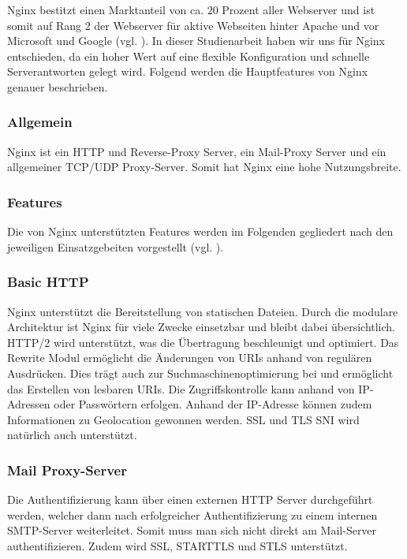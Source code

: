 Nginx bestitzt einen Marktanteil von ca. 20 Prozent aller Webserver und ist somit auf Rang 2 der Webserver für aktive Webseiten hinter Apache und vor Microsoft und Google (vgl. \cite{.k}). In dieser Studienarbeit haben wir uns für Nginx entschieden, da ein hoher Wert auf eine flexible Konfiguration und schnelle Serverantworten gelegt wird. Folgend werden die Hauptfeatures von Nginx genauer beschrieben.

\subsubsection{Allgemein}
\label{sec:NginxAllgemein}
Nginx ist ein \ac{HTTP} und Reverse-Proxy Server, ein Mail-Proxy Server und ein allgemeiner \ac{TCP}/\ac{UDP} Proxy-Server. Somit hat Nginx eine hohe Nutzungsbreite.

\subsubsection{Features}
\label{sec:NginxFeatures}
Die von Nginx unterstützten Features werden im Folgenden gegliedert nach den jeweiligen Einsatzgebeiten vorgestellt (vgl. \cite{.14.03.2017}). 

\subsubsection{Basic HTTP}
\label{sec:NginxBasicHTTP}
Nginx unterstützt die Bereitstellung von statischen Dateien. Durch die modulare Architektur ist Nginx für viele Zwecke einsetzbar und bleibt dabei übersichtlich. \ac{HTTP}/2 wird unterstützt, was die Übertragung beschleunigt und optimiert. Das Rewrite Modul ermöglicht die Änderungen von URIs anhand von regulären Ausdrücken. Dies trägt auch zur Suchmaschinenoptimierung bei und ermöglicht das Erstellen von lesbaren \ac{URI}s. Die Zugriffskontrolle kann anhand von \ac{IP}-Adressen oder Passwörtern erfolgen. Anhand der \ac{IP}-Adresse können zudem Informationen zu Geolocation gewonnen werden. \ac{SSL} und \ac{TLS} \ac{SNI} wird natürlich auch unterstützt.

\subsubsection{Mail Proxy-Server}
\label{sec:NginxMail Proxy-Server}
Die Authentifizierung kann über einen externen \ac{HTTP} Server durchgeführt werden, welcher dann nach erfolgreicher Authentifizierung zu einem internen SMTP-Server weiterleitet. Somit muss man sich nicht direkt am Mail-Server authentifizieren. Zudem wird \ac{SSL}, STARTTLS und STLS unterstützt.


